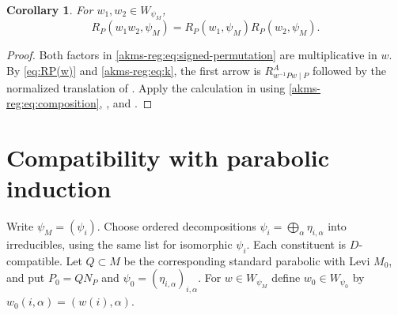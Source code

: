 \documentclass[11pt,reqno]{amsart}
\theoremstyle{plain}
\newtheorem{cor}[thm]{Corollary}
\theoremstyle{definition}
\numberwithin{equation}{subsection}
\begin{document}
\begin{cor}\label{akms-reg:cor:compound-multiplicativity}
For $w_1,w_2\in W_{\psi_M}$,
\[
 R_P(w_1w_2,\psi_M)=R_P(w_1,\psi_M)R_P(w_2,\psi_M).
\]
\end{cor}
\begin{proof}
Both factors in \eqref{akms-reg:eq:signed-permutation} are
multiplicative in $w$. By \eqref{eq:RP(w)} and
\eqref{akms-reg:eq:k}, the first arrow is $R^A_{w^{-1}Pw\mid P}$
followed by the normalized translation of
\cite[\S2.3]{KMSW}. Apply the calculation in
\cite[Lem.~2.5.3]{KMSW} using \eqref{akms-reg:eq:composition},
\cite[Lem.~2.2.5]{KMSW}, and
\cite[Lem.~2.3.1, Fact~2.3.2]{KMSW}.
\end{proof}

\section{Compatibility with parabolic induction}\label{akms-ind:appendix}

Write $\psi_M=(\psi_i)$. Choose ordered decompositions
$\psi_i=\bigoplus_\alpha\eta_{i,\alpha}$ into irreducibles, using the
same list for isomorphic $\psi_i$. Each constituent is $D$-compatible.
Let $Q\subset M$ be the corresponding standard parabolic with Levi
$M_0$, and put $P_0=QN_P$ and $\psi_0=(\eta_{i,\alpha})_{i,\alpha}$.
For $w\in W_{\psi_M}$ define $w_0\in W_{\psi_0}$ by
$w_0(i,\alpha)=(w(i),\alpha)$.
\end{document}
